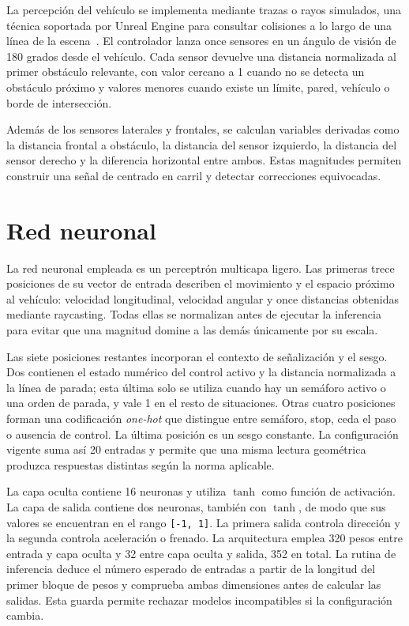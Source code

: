 La percepción del vehículo se implementa mediante trazas o rayos simulados, una técnica soportada por Unreal Engine para consultar colisiones a lo largo de una línea de la escena~\cite{traces}. El controlador lanza once sensores en un ángulo de visión de 180 grados desde el vehículo. Cada sensor devuelve una distancia normalizada al primer obstáculo relevante, con valor cercano a 1 cuando no se detecta un obstáculo próximo y valores menores cuando existe un límite, pared, vehículo o borde de intersección.

Además de los sensores laterales y frontales, se calculan variables derivadas como la distancia frontal a obstáculo, la distancia del sensor izquierdo, la distancia del sensor derecho y la diferencia horizontal entre ambos. Estas magnitudes permiten construir una señal de centrado en carril y detectar correcciones equivocadas.

\section{Red neuronal}

La red neuronal empleada es un perceptrón multicapa ligero. Las primeras trece posiciones de su vector de entrada describen el movimiento y el espacio próximo al vehículo: velocidad longitudinal, velocidad angular y once distancias obtenidas mediante raycasting. Todas ellas se normalizan antes de ejecutar la inferencia para evitar que una magnitud domine a las demás únicamente por su escala.

Las siete posiciones restantes incorporan el contexto de señalización y el sesgo. Dos contienen el estado numérico del control activo y la distancia normalizada a la línea de parada; esta última solo se utiliza cuando hay un semáforo activo o una orden de parada, y vale 1 en el resto de situaciones. Otras cuatro posiciones forman una codificación \textit{one-hot} que distingue entre semáforo, stop, ceda el paso o ausencia de control. La última posición es un sesgo constante. La configuración vigente suma así 20 entradas y permite que una misma lectura geométrica produzca respuestas distintas según la norma aplicable.

La capa oculta contiene 16 neuronas y utiliza \(\tanh\) como función de activación. La capa de salida contiene dos neuronas, también con \(\tanh\), de modo que sus valores se encuentran en el rango \texttt{[-1, 1]}. La primera salida controla dirección y la segunda controla aceleración o frenado. La arquitectura emplea 320 pesos entre entrada y capa oculta y 32 entre capa oculta y salida, 352 en total. La rutina de inferencia deduce el número esperado de entradas a partir de la longitud del primer bloque de pesos y comprueba ambas dimensiones antes de calcular las salidas. Esta guarda permite rechazar modelos incompatibles si la configuración cambia.

